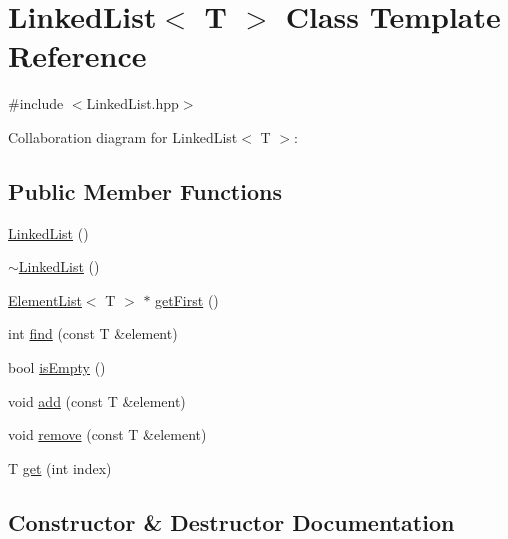 \hypertarget{class_linked_list}{}\section{Linked\+List$<$ T $>$ Class Template Reference}
\label{class_linked_list}


{\ttfamily \#include $<$Linked\+List.\+hpp$>$}



Collaboration diagram for Linked\+List$<$ T $>$\+:
\subsection*{Public Member Functions}
\begin{DoxyCompactItemize}
\item 
\mbox{\hyperlink{class_linked_list_a3c20fcfec867e867f541061a09fc640c}{Linked\+List}} ()
\item 
\mbox{\hyperlink{class_linked_list_a7c37609df3b83bc4eb0281b852f93fd7}{$\sim$\+Linked\+List}} ()
\item 
\mbox{\hyperlink{struct_element_list}{Element\+List}}$<$ T $>$ $\ast$ \mbox{\hyperlink{class_linked_list_a4ea79e8ffd6bb92736df640d86a04705}{get\+First}} ()
\item 
int \mbox{\hyperlink{class_linked_list_a6f359c1f8a9fded8c89d00a97c4287fb}{find}} (const T \&element)
\item 
bool \mbox{\hyperlink{class_linked_list_a7ecbb28e82117a680839ed0dc28ebdce}{is\+Empty}} ()
\item 
void \mbox{\hyperlink{class_linked_list_a0083b3395050b2e601388bc7872a03d8}{add}} (const T \&element)
\item 
void \mbox{\hyperlink{class_linked_list_a464f248b57c763a253f9bba018d1a857}{remove}} (const T \&element)
\item 
T \mbox{\hyperlink{class_linked_list_a25079ed9b408efad63a1522c818d8705}{get}} (int index)
\end{DoxyCompactItemize}


\subsection{Constructor \& Destructor Documentation}
\mbox{\label{class_linked_list_a3c20fcfec867e867f541061a09fc640c}} 
